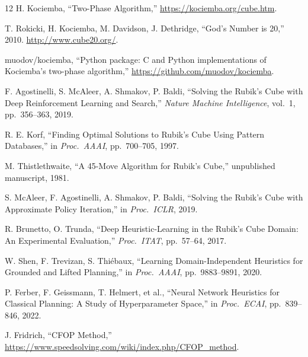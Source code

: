 \documentclass[10pt,twocolumn,a4paper]{article}
\begin{document}
\begin{thebibliography}{12}
H. Kociemba, ``Two-Phase Algorithm,'' \url{https://kociemba.org/cube.htm}.

T. Rokicki, H. Kociemba, M. Davidson, J. Dethridge, ``God's Number is 20,'' 2010. \url{http://www.cube20.org/}.

muodov/kociemba, ``Python package: C and Python implementations of Kociemba's two-phase algorithm,'' \url{https://github.com/muodov/kociemba}.

F. Agostinelli, S. McAleer, A. Shmakov, P. Baldi, ``Solving the Rubik's Cube with Deep Reinforcement Learning and Search,'' \textit{Nature Machine Intelligence}, vol.~1, pp.~356--363, 2019.

R. E. Korf, ``Finding Optimal Solutions to Rubik's Cube Using Pattern Databases,'' in \textit{Proc.\ AAAI}, pp.~700--705, 1997.

M. Thistlethwaite, ``A 45-Move Algorithm for Rubik's Cube,'' unpublished manuscript, 1981.

S. McAleer, F. Agostinelli, A. Shmakov, P. Baldi, ``Solving the Rubik's Cube with Approximate Policy Iteration,'' in \textit{Proc.\ ICLR}, 2019.

R. Brunetto, O. Trunda, ``Deep Heuristic-Learning in the Rubik's Cube Domain: An Experimental Evaluation,'' \textit{Proc.\ ITAT}, pp.~57--64, 2017.

W. Shen, F. Trevizan, S. Thi\'ebaux, ``Learning Domain-Independent Heuristics for Grounded and Lifted Planning,'' in \textit{Proc.\ AAAI}, pp.~9883--9891, 2020.

P. Ferber, F. Geissmann, T. Helmert, et al., ``Neural Network Heuristics for Classical Planning: A Study of Hyperparameter Space,'' in \textit{Proc.\ ECAI}, pp.~839--846, 2022.

J. Fridrich, ``CFOP Method,'' \url{https://www.speedsolving.com/wiki/index.php/CFOP_method}.
\end{thebibliography}
\end{document}
